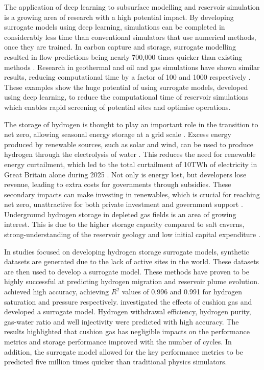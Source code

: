 

The application of deep learning to subsurface modelling and reservoir simulation is a growing area of research with a high potential impact. By developing surrogate models using deep learning, simulations can be completed in considerably less time than conventional simulators that use numerical methods, once they are trained. In carbon capture and storage, surrogate modelling resulted in flow predictions being nearly 700,000 times quicker than existing methods \citep{gegewen_nested}. Research in geothermal and oil and gas simulations have shown similar results, reducing computational time by a factor of 100 and 1000 respectively \citep{DENG_geothermal, Huang_gnn_oil_gas}. These examples show the huge potential of using surrogate models, developed using deep learning, to reduce the computational time of reservoir simulations which enables rapid screening of potential sites and optimise operations. 

The storage of hydrogen is thought to play an important role in the transition to net zero, allowing seasonal energy storage at a grid scale \citep{krevor2023subsurface}. Excess energy produced by renewable sources, such as solar and wind, can be used to produce hydrogen through the electrolysis of water \citep{kumar2022overview}. This reduces the need for renewable energy curtailment, which led to the total curtailment of 10TWh of electricity in Great Britain alone during 2025 \citep{montel2025curtailment}. Not only is energy lost, but developers lose revenue, leading to extra costs for governments through subsidies. These secondary impacts can make investing in renewables, which is crucial for reaching net zero, unattractive for both private investment and government support \citep{iea2025renewables}. Underground hydrogen storage in depleted gas fields is an area of growing interest. This is due to the higher storage capacity compared to salt caverns, strong-understanding of the reservoir geology and low initial capital expenditure \citep{FU_uhs_Surrogate}. 

In studies focused on developing hydrogen storage surrogate models, synthetic datasets are generated due to the lack of active sites in the world. These datasets are then used to develop a surrogate model. These methods have proven to be highly successful at predicting hydrogen migration and reservoir plume evolution. \citet{FU_uhs_Surrogate} achieved high accuracy, achieving $R^2$ values of 0.996 and 0.991 for hydrogen saturation and pressure respectively. \citet{MAO_cushion} investigated the effects of cushion gas and developed a surrogate model. Hydrogen withdrawal efficiency, hydrogen purity, gas-water ratio and well injectivity were predicted with high accuracy. The results highlighted that cushion gas has negligible impacts on the performance metrics and storage performance improved with the number of cycles. In addition, the surrogate model allowed for the key performance metrics to be predicted five million times quicker than traditional physics simulators. 

